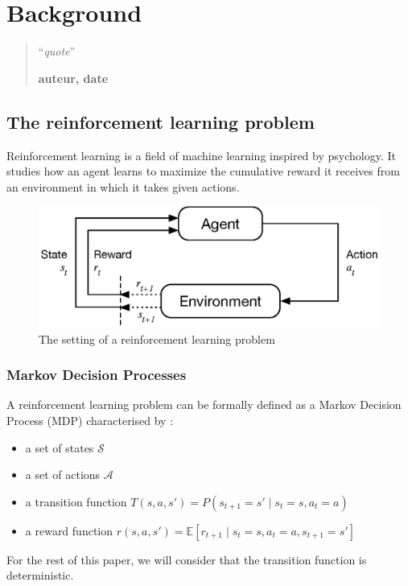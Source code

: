 \chapter{Background}
\begin{quotation}
\noindent ``\emph{quote}''
\begin{flushright}\textbf{auteur, date}\end{flushright}
\end{quotation}

\vspace*{0.5cm}

\section{The reinforcement learning problem}
Reinforcement learning is a field of machine learning inspired by psychology.
It studies how an agent learns to maximize the cumulative reward it receives
from an environment in which it takes given actions.\\

\begin{figure}[]
	\centering
	\includegraphics[width=0.65\linewidth]{fig/rl.eps}
	\caption{The setting of a reinforcement learning problem 
		\cite{suttonbarto}}
	\label{fig:rl}
\end{figure}

\subsection{Markov Decision Processes}
A reinforcement learning problem can be formally defined as a Markov 
Decision Process (MDP)  characterised by :
\begin{itemize}
	\item a set of states $\mathcal{S}$
	\item a set of actions $\mathcal{A}$
	\item a transition function 
		$T(s, a, s') = P(s_{t+1} = s' \mid s_t = s, a_t = a)$
	\item a reward function 
		$r(s, a, s') = \mathbb{E}
		 [r_{t+1} \mid s_t = s, a_t = a, s_{t+1} = s']$
\end{itemize}
For the rest of this paper, we will consider that the transition function is
deterministic.\\

